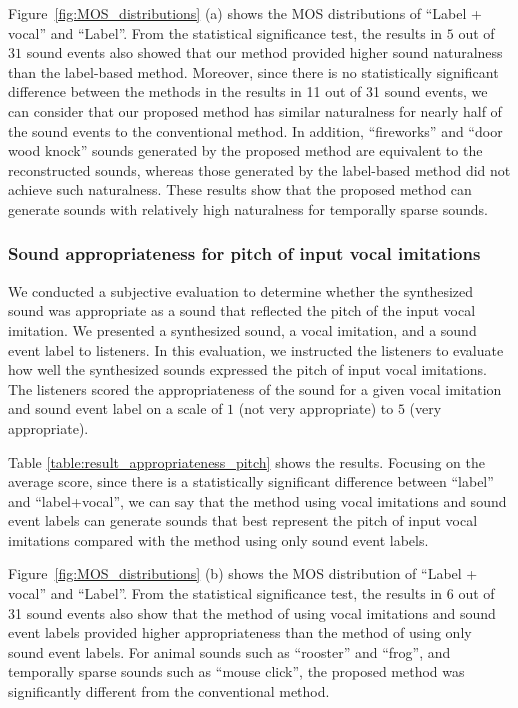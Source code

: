 \documentclass{article}
\begin{document}
Figure~\ref{fig:MOS_distributions} (a) shows the MOS distributions of ``Label + vocal'' and ``Label''.
From the statistical significance test, the results in $5$ out of $31$ sound events also showed that our method provided higher sound naturalness than the label-based method.
Moreover, since there is no statistically significant difference between the methods in the results in 11 out of 31 sound events, we can consider that our proposed method has similar naturalness for nearly half of the sound events to the conventional method.
In addition, ``fireworks'' and ``door wood knock'' sounds generated by the proposed method are equivalent to the reconstructed sounds, whereas those generated by the label-based method did not achieve such naturalness.
These results show that the proposed method can generate sounds with relatively high naturalness for temporally sparse sounds. 
%
\vspace{-3pt}
\subsubsection{Sound appropriateness for pitch of input vocal imitations}
\vspace{-3pt}
\label{eval:sound_appropriateness_pitch}
We conducted a subjective evaluation to determine whether the synthesized sound was appropriate as a sound that reflected the pitch of the input vocal imitation.
We presented a synthesized sound, a vocal imitation, and a sound event label to listeners.
In this evaluation, we instructed the listeners to evaluate how well the synthesized sounds expressed the pitch of input vocal imitations.
The listeners scored the appropriateness of the sound for a given vocal imitation and sound event label on a scale of $1$ (not very appropriate) to $5$ (very appropriate).

Table \ref{table:result_appropriateness_pitch} shows the results.
Focusing on the average score, since there is a statistically significant difference between ``label'' and ``label+vocal'', we can say that the method using vocal imitations and sound event labels can generate sounds that best represent the pitch of input vocal imitations compared with the method using only sound event labels.

Figure~\ref{fig:MOS_distributions} (b) shows the MOS distribution of ``Label + vocal'' and ``Label''.
From the statistical significance test, the results in 6 out of 31 sound events also show that the method of using vocal imitations and sound event labels provided higher appropriateness than the method of using only sound event labels.
For animal sounds such as ``rooster'' and ``frog'', and temporally sparse sounds such as ``mouse click'', the proposed method was significantly different from the conventional method.
\end{document}
